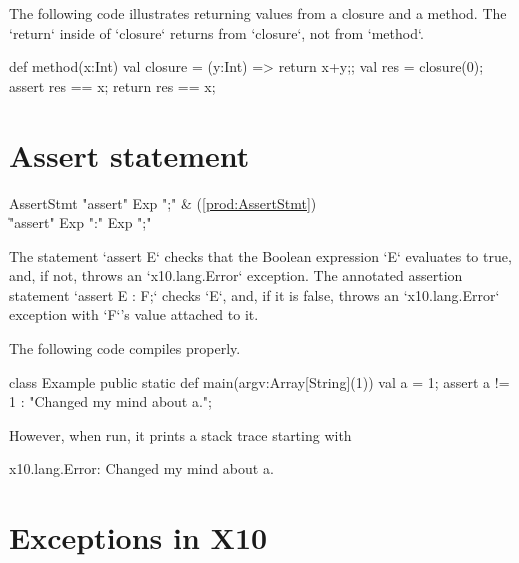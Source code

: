 \begin{ex}
The following code illustrates returning values from a closure and a method.
The \xcd`return` inside of \xcd`closure` returns from \xcd`closure`, not from
\xcd`method`.  
\begin{xten}
def method(x:Int) {
  val closure = (y:Int) => {return x+y;}; 
  val res = closure(0);
  assert res == x;
  return res == x;
}
\end{xten}


\end{ex}


\section{Assert statement} 

\begin{bbgrammar}
          AssertStmt \: \xcd"assert" Exp \xcd";" & (\ref{prod:AssertStmt}) \\
                     \| \xcd"assert" Exp  \xcd":" Exp  \xcd";" \\
\end{bbgrammar}

The statement \xcd`assert E` checks that the Boolean expression \xcd`E`
evaluates to true, and, if not, throws an \xcd`x10.lang.Error`  exception.  
The annotated assertion statement \xcd`assert E : F;` checks \xcd`E`, and, if
it is 
false, throws an \xcd`x10.lang.Error` exception with \xcd`F`'s value attached
to it. 

\begin{ex}
The following code compiles properly.  
% 
\begin{xten}
class Example {
  public static def main(argv:Array[String](1)) {
    val a = 1;
    assert a != 1 : "Changed my mind about a.";
  }
}
\end{xten}
\noindent
However, when run, it 
prints a stack trace starting with 
\begin{xten}
x10.lang.Error: Changed my mind about a.
\end{xten}
\end{ex}

\section{Exceptions in X10}


